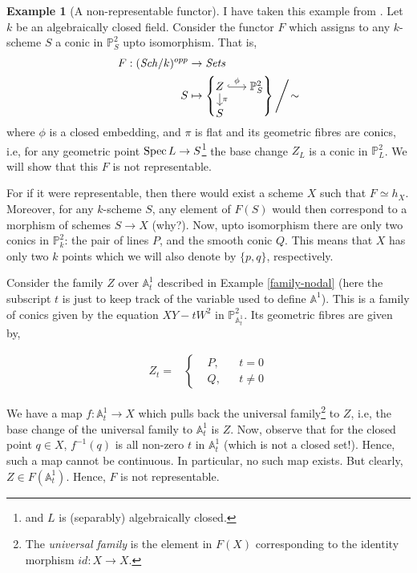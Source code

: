 \documentclass[11pt]{amsart}
\newcommand{\Spec}{{\rm Spec \,}}
\newcommand{\A}{{\mathbb A}}
\renewcommand{\P}{{\mathbb P}}
\theoremstyle{definition}
\newtheorem{example}[theorem]{Example}
\begin{document}
\begin{example}[A non-representable functor]\label{functor-of-conics} I have taken this example from \cite{Bogges}. Let $k$ be an algebraically closed field. Consider the functor $F$ which assigns to any $k$-scheme $S$ a conic in $\P_S^2$ upto isomorphism. That is, 
	\begin{align*}
	F: (\mathit{Sch}/k)^{opp} & \rightarrow \mathit{Sets}\\
	S & \mapsto \left\{
	\begin{tikzcd}[cramped, row sep =2ex, column sep=4ex ,ampersand replacement=\&]
	Z\arrow[r,hook,"\phi"]\arrow[d,"\pi"] \& \P_S^2\\
	S
	\end{tikzcd}\right\} \Bigg/\!\sim
	\end{align*}
	where $\phi$ is a closed embedding, and $\pi$ is flat and its geometric fibres are conics, i.e, for any geometric point $\Spec L\rightarrow S$\footnote{and $L$ is (separably) algebraically closed.} the base change $Z_L$ is a conic in $\P_L^2$. We will show that this $F$ is not representable.
	
	For if it were representable, then there would exist a scheme $X$ such that $F\simeq h_X$. Moreover, for any $k$-scheme $S$, any element of $F(S)$ would then correspond to a morphism of schemes $S\rightarrow X$ (why?). Now, upto isomorphism there are only two conics in $\P_k^2$: the pair of lines $P$, and the smooth conic $Q$. This means that $X$ has only two $k$ points which we will also denote by $\{p,q\}$, respectively.
	
	Consider the family $Z$ over $\A_t^1$ described in Example \ref{family-nodal} (here the subscript $t$ is just to keep track of the variable used to define $\A^1$). This is a family of conics given by the equation $XY-tW^2$ in $\P_{\A_t^1}^2$. Its geometric fibres are given by,
	\begin{center}
		\begin{align*}
		Z_t = &\left\{
		\begin{aligned}
		& P,  && t=0\\
		& Q,  && t\neq 0
		\end{aligned}\right.
		\end{align*}
	\end{center}
	We have a map $f:\A_t^1\rightarrow X$ which pulls back the universal family\footnote{The \textit{universal family} is the element in $F(X)$ corresponding to the identity morphism $id: X\rightarrow X$.} to $Z$, i.e, the base change of the universal family to $\A_t^1$ is $Z$. Now, observe that for the closed point $q\in X$, $f^{-1}(q)$ is all non-zero $t$ in $\A_t^1$ (which is not a closed set!). Hence, such a map cannot be continuous. In particular, no such map exists. But clearly, $Z\in F(\A_t^1)$. Hence, $F$ is not representable.
\end{example}
\end{document}
